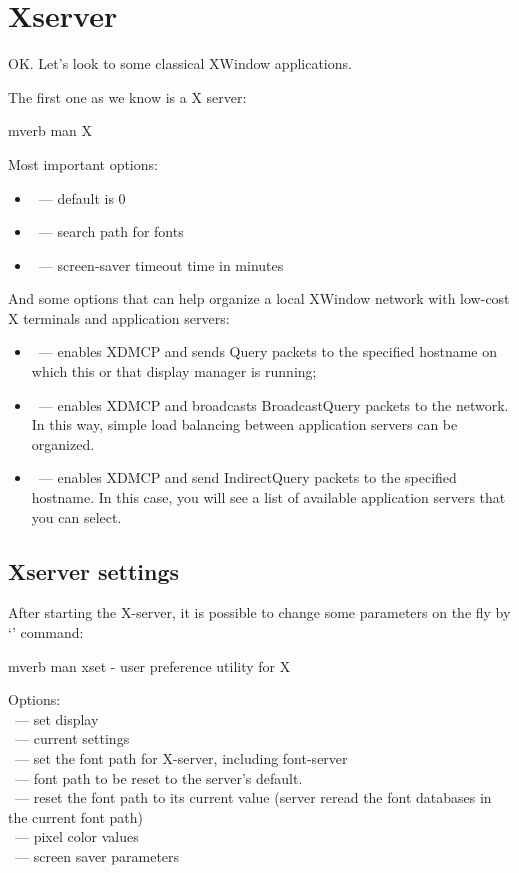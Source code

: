 \section*{Xserver} %

OK. Let's look to some classical XWindow applications.

The first one as we know is a X server:
\begin{code}{mverb}
man X
\end{code}

Most important options:
\begin{itemize}
\item{}~--- default is 0
\item{}~--- search path for fonts
\item{}~--- screen-saver timeout time in minutes
\end{itemize}

And some options that can help organize a local XWindow network with
low-cost X terminals and application servers:
\begin{itemize}
\item {}~--- enables XDMCP and sends Query packets to
      the specified hostname on which this or that display manager is running;
\item {}~--- enables XDMCP and broadcasts BroadcastQuery packets
      to the network. In this way, simple load balancing between application
      servers can be organized.
\item {}~--- enables XDMCP and send IndirectQuery packets
      to the specified hostname. In this case, you will see a list of available
      application servers that you can select.
\end{itemize}

\subsection*{Xserver settings} %

After starting the X-server, it is possible to change some parameters
on the fly by `' command:
\begin{code}{mverb}
man xset - user preference utility for X
\end{code}

\noindent
Options:\\
~--- set display\\
~--- current settings\\
~--- set the font path for X-server, including
    font-server\\
~--- font path to be reset to the server’s default.\\
~--- reset the font path to its current value (server reread
    the font databases in the current font path)\\
~--- pixel color values\\
~--- screen saver parameters



